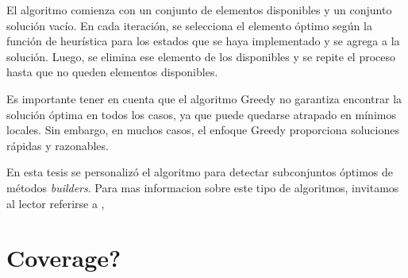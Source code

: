 El algoritmo comienza con un conjunto de elementos disponibles y un conjunto solución vacío. En cada iteración, se selecciona el elemento óptimo según la función de heurística para los estados que se haya implementado y se agrega a la solución. Luego, se elimina ese elemento de los disponibles y se repite el proceso hasta que no queden elementos disponibles.

Es importante tener en cuenta que el algoritmo Greedy no garantiza encontrar la solución óptima en todos los casos, ya que puede quedarse atrapado en mínimos locales. Sin embargo, en muchos casos, el enfoque Greedy proporciona soluciones rápidas y razonables.

En esta tesis se personalizó el algoritmo para detectar subconjuntos óptimos de métodos \emph{builders}. 
Para mas informacion sobre este tipo de algoritmos, invitamos al lector referirse a \cite{Cormen2009}, \cite{kleinberg2006}

\section{Coverage?}

